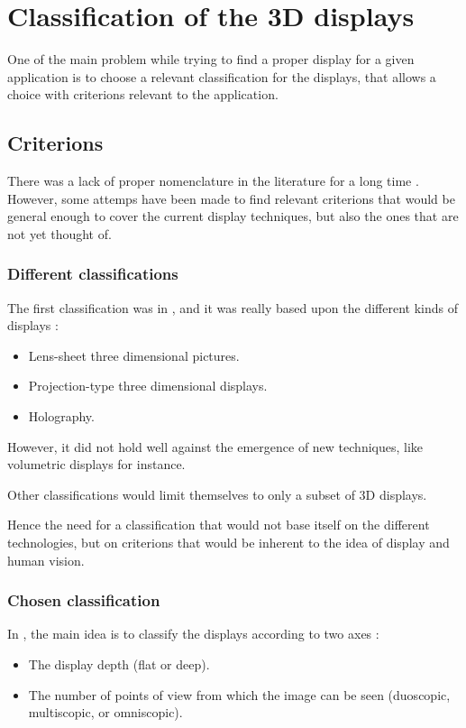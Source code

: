 \section{Classification of the 3D displays}
One of the main problem while trying to find a proper \gls{display} for a given application is to choose a relevant classification for the displays, that allows a choice with criterions relevant to the application.
\subsection{Criterions}
There was a lack of proper nomenclature in the literature for a long time \cite{pimenta2012comprehensive}. However, some attemps have been made to find relevant criterions that would be general enough to cover the current display techniques, but also the ones that are not yet thought of.

\subsubsection{Different classifications}
The first classification was in \cite{okoshi1976three}, and it was really based upon the different kinds of displays : 
\begin{itemize}
\item Lens-sheet three dimensional pictures.
\item Projection-type three dimensional displays.
\item Holography.
\end{itemize}

However, it did not hold well against the emergence of new techniques, like volumetric displays for instance.

Other classifications %
would limit themselves to only a subset of 3D displays.

Hence the need for a classification that would not base itself on the different technologies, but on criterions that would be inherent to the idea of display and human vision.

\subsubsection{Chosen classification}
In \cite{pimenta2012comprehensive}, the main idea is to classify the displays according to two axes : 

\begin{itemize}
\item The display depth (flat or deep).
\item The number of points of view from which the image can be seen (duoscopic, multiscopic, or omniscopic).
\end{itemize}

